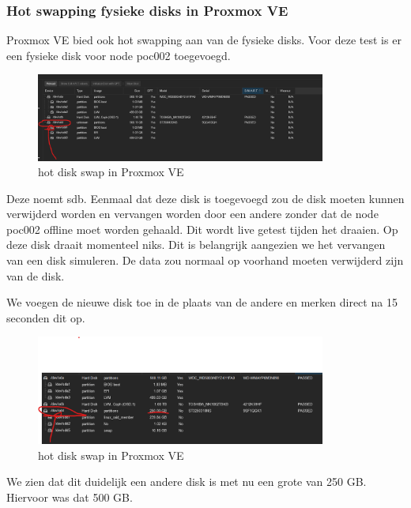 \subsubsection{Hot swapping fysieke disks in Proxmox VE}
Proxmox VE bied ook hot swapping aan van de fysieke disks. 
Voor deze test is er een fysieke disk voor node poc002 toegevoegd.
\begin{figure}[H]
  \centering
  \includegraphics[width=0.85\textwidth]{../poc/hot-disk-prox.png}
  \caption{hot disk swap in Proxmox VE}
  \label{fig:hotdisk-swap}
\end{figure}
Deze noemt sdb. Eenmaal dat deze disk is toegevoegd zou de disk moeten kunnen verwijderd worden en vervangen worden door een andere zonder dat de node poc002 offline moet worden gehaald.
Dit wordt live getest tijden het draaien. Op deze disk draait momenteel niks. Dit is belangrijk aangezien we het vervangen van een disk simuleren. De data zou normaal op voorhand moeten verwijderd zijn van de disk.

We voegen de nieuwe disk toe in de plaats van de andere en merken direct na 15 seconden dit op.
\begin{figure}[H]
  \centering
  \includegraphics[width=0.85\textwidth]{../poc/hot-disktwee-prox.png}
  \caption{hot disk swap in Proxmox VE}
  \label{fig:hotdiskvervangen-swap}
\end{figure}

We zien dat dit duidelijk een andere disk is met nu een grote van 250 GB. Hiervoor was dat 500 GB.